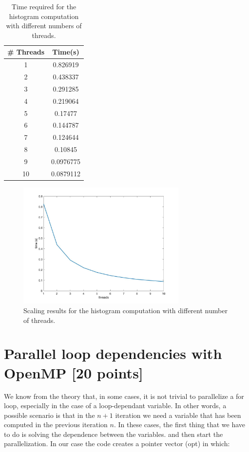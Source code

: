 \documentclass[unicode,11pt,a4paper,oneside,numbers=endperiod,openany]{scrartcl}
\begin{document}
\begin{table}
\begin{center}
	\begin{tabular}{|c|c|}
		\hline
		\textbf{\# Threads} & \textbf{Time(s)}\\
		\hline\hline
		1 & 0.826919  \\
		\hline
		2  & 0.438337  \\
		\hline
		3  & 0.291285  \\
		\hline
		4  & 0.219064  \\
		\hline
		5  & 0.17477  \\
		\hline
		6  & 0.144787  \\
		\hline
		7  & 0.124644  \\
		\hline
		8  & 0.10845  \\
		\hline
		9  & 0.0976775  \\
		\hline
		10  & 0.0879112  \\
		\hline
	\end{tabular}
\end{center}
\caption{Time required for the histogram computation with different numbers of threads.}\label{tab:hist}
\end{table}


\begin{figure}[h]
\centering
\includegraphics[width=0.75\textwidth]{Figures/histTimes.jpg}
\caption{Scaling results for the histogram computation with different number of threads.}\label{fig:histScaling}
\end{figure}





\section{Parallel loop dependencies with OpenMP [20 points]}
We know from the theory that, in some cases, it is not trivial to parallelize a for loop, especially in the case of a loop-dependant variable. In other words, a possible scenario is that in the $n+1$ iteration we need a variable that has been computed in the previous iteration $n$. In these cases, the first thing that we have to do is solving the dependence between the variables. and then start the parallelization. In our case the code creates a pointer vector (opt) in which:
\end{document}
